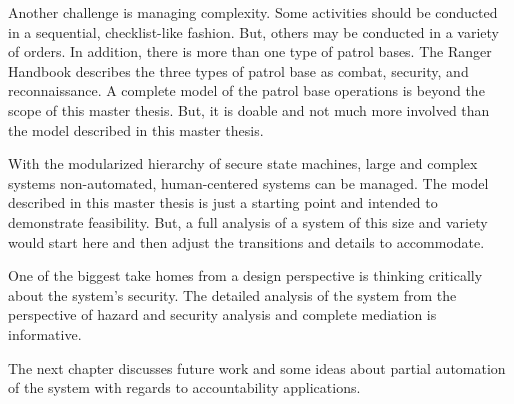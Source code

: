\documentclass[../../main/main.tex]{subfiles}
\begin{document}
Another challenge is managing complexity.  Some activities should be conducted in a sequential, checklist-like fashion.  But, others may be conducted in a variety of orders.  In addition, there is more than one type of patrol bases.  The Ranger Handbook describes the three types of patrol base as combat, security, and reconnaissance.  A complete model of the patrol base operations is beyond the scope of this master thesis.  But, it is doable and not much more involved than the model described in this master thesis.  

With the modularized hierarchy of secure state machines, large and complex systems non-automated, human-centered systems can be managed.  The model described in this master thesis is just a starting point and intended to demonstrate feasibility.  But, a full analysis of a system of this size and variety would start here and then adjust the transitions and details to accommodate.  

One of the biggest take homes from a design perspective is thinking critically about the system's security.  The detailed analysis of the system from the perspective of hazard and security analysis and complete mediation is informative.  

The next chapter discusses future work and some ideas about partial automation of the system with regards to accountability applications.
 
\end{document}
